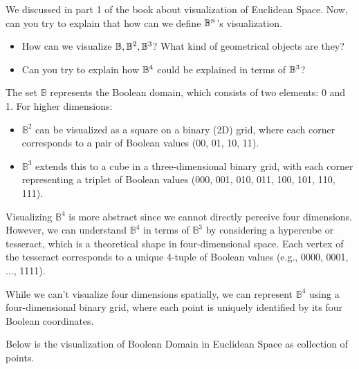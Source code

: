 \begin{exercise}\label{bool_func_vis}
    We discussed in part 1 of the book about visualization of Euclidean Space. Now, can you try to
    explain that how can we define $\mathbb{B}^n$'s visualization.
    \begin{itemize}
        \item How can we visualize $\mathbb{B}, \mathbb{B}^2, \mathbb{B}^3$? What kind of geometrical objects are they?
        \item Can you try to explain how $\mathbb{B}^4$ could be explained in terms of $\mathbb{B}^3$?
    \end{itemize}
\end{exercise}
\begin{solution}
    The set \( \mathbb{B} \) represents the Boolean domain, which consists of two elements: 0 and 1. For higher dimensions:
    \begin{itemize}
        \item \( \mathbb{B}^2 \) can be visualized as a square on a binary (2D) grid, where each corner corresponds to a pair of Boolean values (00, 01, 10, 11).
        \item \( \mathbb{B}^3 \) extends this to a cube in a three-dimensional binary grid, with each corner representing a triplet of Boolean values (000, 001, 010, 011, 100, 101, 110, 111).
    \end{itemize}

    Visualizing \( \mathbb{B}^4 \) is more abstract since we cannot directly perceive four dimensions. However, we can understand \( \mathbb{B}^4 \) in terms of \( \mathbb{B}^3 \) by considering a hypercube or tesseract, which is a theoretical shape in four-dimensional space. Each vertex of the tesseract corresponds to a unique 4-tuple of Boolean values (e.g., 0000, 0001, ..., 1111). 

    While we can't visualize four dimensions spatially, we can represent \( \mathbb{B}^4 \) using a four-dimensional binary grid, where each point is uniquely identified by its four Boolean coordinates.
\end{solution}
    Below is the visualization of Boolean Domain in Euclidean Space as collection of 
    points. 
